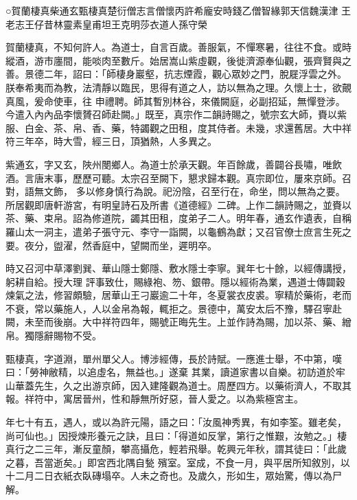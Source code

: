 
\begin{pinyinscope}

 ○賀蘭棲真柴通玄甄棲真楚衍僧志言僧懷丙許希龐安時錢乙僧智緣郭天信魏漢津
 王老志王仔昔林靈素皇甫坦王克明莎衣道人孫守榮



 賀蘭棲真，不知何許人。為道士，自言百歲。善服氣，不憚寒暑，往往不食。或時縱酒，游市廛間，能啖肉至數斤。始居嵩山紫虛觀，後徙濟源奉仙觀，張齊賢與之善。景德二年，詔曰：「師棲身巖壑，抗志煙霞，觀心眾妙之門，脫屣浮雲之外。朕奉希夷而為教，法清靜以臨民，思得有道之人，訪以無為之理。久懷上士，欲覿真風，爰命使車，往
 申禮聘。師其暫別林谷，來儀闕庭，必副招延，無憚登涉。今遣入內內品李懷贇召師赴闕。」既至，真宗作二韻詩賜之，號宗玄大師，賚以紫服、白金、茶、帛、香、藥，特蠲觀之田租，度其侍者。未幾，求還舊居。大中祥符三年卒，時大雪，經三日，頂猶熱，人多異之。



 紫通玄，字又玄，陜州閿鄉人。為道士於承天觀。年百餘歲，善闢谷長嘯，唯飲酒。言唐末事，歷歷可聽。太宗召至闕下，懇求歸本觀。真宗即位，屢來京師。召對，語無文飾，
 多以修身慎行為說。祀汾陰，召至行在，命坐，問以無為之要。所居觀即唐軒游宮，有明皇詩石及所書《道德經》二碑。上作二韻詩賜之，並賚以茶、藥、束帛。詔為修道院，蠲其田租，度弟子二人。明年春，通玄作遺表，自稱羅山太一洞主，遣弟子張守元、李守一詣闕，以龜鶴為獻；又召官僚士庶言生死之要。夜分，盥濯，然香庭中，望闕而坐，遲明卒。



 時又召河中草澤劉巽、華山隱士鄭隱、敷水隱士李寧。巽年七十餘，以經傳講授，躬耕自給。授大理
 評事致仕，賜綠袍、笏、銀帶。隱以經術為業，遇道士傳闢穀煉氣之法，修習頗驗，居華山王刁巖逾二十年，冬夏裳衣皮裘。寧精於藥術，老而不衰，常以藥施人，人以金帛為報，輒拒之。景德中，萬安太后不豫，驛召寧赴闕，未至而後崩。大中祥符四年，賜號正晦先生。上並作詩為賜，加以茶、藥、繒帛。獨隱辭賜物不受。



 甄棲真，字道淵，單州單父人。博涉經傳，長於詩賦。一應進士舉，不中第，嘆曰：「勞神敝精，以追虛名，無益也。」遂棄
 其業，讀道家書以自樂。初訪道於牢山華蓋先生，久之出游京師，因入建隆觀為道士。周歷四方。以藥術濟人，不取其報。祥符中，寓居晉州，性和靜無所好惡，晉人愛之。以為紫極宮主。



 年七十有五，遇人，或以為許元陽，語之曰：「汝風神秀異，有如李筌。雖老矣，尚可仙也。」因授煉形養元之訣，且曰：「得道如反掌，第行之惟艱，汝勉之。」棲真行之二三年，漸反童顏，攀高攝危，輕若飛舉。乾興元年秋，謂其徒曰：「此歲之暮，吾當逝矣。」即宮西北隅自甃
 殯室。室成，不食一月，與平居所知敘別，以十二月二日衣紙衣臥磚塌卒。人未之奇也。及歲久，形如生，眾始驚，傳以為尸解。




\end{pinyinscope}
